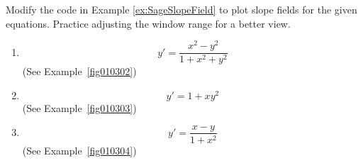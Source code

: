 \documentclass{ximera}
\begin{document}
\begin{problem}\label{prob:SageSlopeField}
    Modify the code in Example \ref{ex:SageSlopeField} to plot slope fields for the given equations.  Practice adjusting the window range for a better view.

\begin{enumerate}
\item\label{ex:fig010302r}
$$
 y'=\frac{x^2-y^2}{1+x^2+y^2}
 $$
(See Example~\ref{fig010302})

\item\label{ex:fig010303r}
$$
y'=1+xy^2
$$
(See Example~\ref{fig010303})

\item\label{ex:fig010304r}
$$
y'=\frac{x-y}{1+x^2}
$$
(See Example~\ref{fig010304})
\end{enumerate} 
\end{problem}
\end{document}
